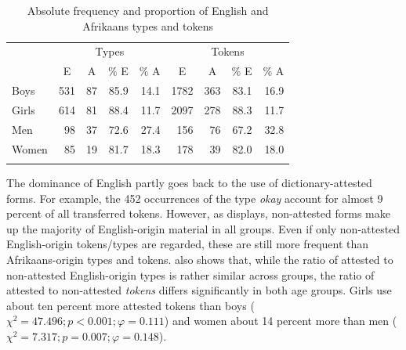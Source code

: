 \documentclass[output=paper]{langsci/langscibook}
\begin{document}
  

  
\begin{table}
\begin{tabular}{lrrrrrrrr}
\lsptoprule
& \multicolumn{4}{c}{Types} & \multicolumn{4}{c}{Tokens}\\\cmidrule(lr){2-5}\cmidrule(lr){6-9}
		& \multicolumn{1}{c}{E} & \multicolumn{1}{c}{A} & \multicolumn{1}{c}{\% E} & \multicolumn{1}{c}{\% A} & \multicolumn{1}{c}{E} & \multicolumn{1}{c}{A} & \multicolumn{1}{c}{\% E} & \multicolumn{1}{c}{\% A}\\
\midrule
Boys & 531 & 87 & 85.9 & 14.1 & 1782 & 363 & 83.1 & 16.9\\
Girls & 614 & 81 & 88.4 & 11.7 & 2097 & 278 & 88.3 & 11.7\\
Men & 98 & 37 & 72.6 & 27.4 & 156 & 76 & 67.2 & 32.8\\
Women & 85 & 19 & 81.7 & 18.3 & 178 & 39 & 82.0 & 18.0\\
\lspbottomrule
\end{tabular}
\caption{Absolute frequency and proportion of English and Afrikaans types and tokens\label{tab:bracke:7}}
\end{table}  

The dominance of English partly goes back to the use of dictionary-attested forms. For example, the 452 occurrences of the type \textit{okay} account for almost 9 percent of all transferred tokens. However, as  displays, non-attested forms make up the majority of English-origin material in all groups. Even if only non-attested English-origin tokens/types are regarded, these are still more frequent than Afrikaans-origin types and tokens.  also shows that, while the ratio of attested to non-attested English-origin types is rather similar across groups, the ratio of attested to non-attested \textit{tokens} differs significantly in both age groups. Girls use about ten percent more attested tokens than boys ($\chi^2 = 47.496; p < 0.001; \varphi = 0.111$) and women about 14 percent more than men ($\chi^2 = 7.317; p = 0.007; \varphi = 0.148$).
\end{document}
